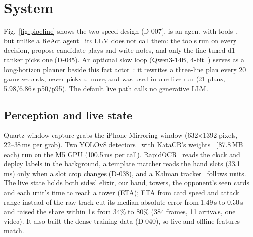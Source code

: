 \section{System}
\label{sec:system}

Fig.~\ref{fig:pipeline} shows the two-speed design (D-007). \cb{} is an agent with tools~\cite{lim2026l15}, but unlike a ReAct agent~\cite{yao2023react} its LLM does not call them: the tools run on every decision, propose candidate plays and write notes, and only the fine-tuned d1 ranker picks one (D-045). An optional slow loop (Qwen3-14B, 4-bit~\cite{qwen2025qwen3}) serves as a long-horizon planner beside this fast actor~\cite{lim2026l16}: it rewrites a three-line plan every 20 game seconds, never picks a move, and was used in one live run (21 plans, 5.98/6.86\,s p50/p95). The default live path calls no generative LLM. %

\subsection{Perception and live state}
Quartz window capture grabs the iPhone Mirroring window (632$\times$1392 pixels, 22--38\,ms per grab). %
Two YOLOv8 detectors~\cite{jocher2023yolov8} with KataCR's weights~\cite{wu2024katacr} (87.8\,MB each) run on the M5 GPU (100.5\,ms per call), RapidOCR~\cite{rapidai2021rapidocr} reads the clock and deploy labels in the background, a template matcher reads the hand slots (33.1\,ms) only when a slot crop changes (D-038), and a Kalman tracker~\cite{kalman1960} follows units. %
The live state holds both sides' elixir, our hand, towers, the opponent's seen cards and each unit's time to reach a tower (ETA); ETA from card speed and attack range instead of the raw track cut its median absolute error from 1.49\,s to 0.30\,s and raised the share within 1\,s from 34\% to 80\% (384 frames, 11 arrivals, one video). %
It also built the dense training data (D-040), so live and offline features match.

